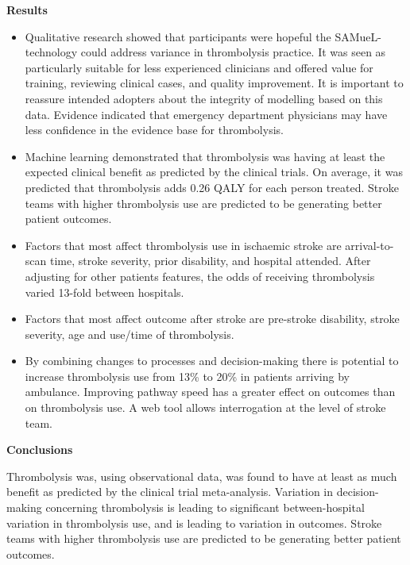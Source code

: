 \textbf{Results}

\begin{itemize}

    \item Qualitative research showed that participants were hopeful the SAMueL-technology could address variance in thrombolysis practice. It was seen as particularly suitable for less experienced clinicians and offered value for training, reviewing clinical cases, and quality improvement. It is important to reassure intended adopters about the integrity of modelling based on this data. Evidence indicated that emergency department physicians may have less confidence in the evidence base for thrombolysis.
    
    \item Machine learning demonstrated that thrombolysis was having at least the expected clinical benefit as predicted by the clinical trials. On average, it was predicted that thrombolysis adds 0.26 QALY for each person treated. Stroke teams with higher thrombolysis use are predicted to be generating better patient outcomes.
    
    \item Factors that most affect thrombolysis use in ischaemic stroke are arrival-to-scan time, stroke severity, prior disability, and hospital attended. After adjusting for other patients features, the odds of receiving thrombolysis varied 13-fold between hospitals.
    
    \item Factors  that most affect outcome after stroke are pre-stroke disability, stroke severity, age and use/time of thrombolysis.
    
    \item By combining changes to processes and decision-making there is potential to increase thrombolysis use from 13\% to 20\% in patients arriving by ambulance. Improving pathway speed has a greater effect on outcomes than on thrombolysis use. A web tool allows interrogation at the level of stroke team.
\end{itemize}


\textbf{Conclusions}

Thrombolysis was, using observational data, was found to have at least as much benefit as predicted by the clinical trial meta-analysis. Variation in decision-making concerning thrombolysis is leading to significant between-hospital variation in thrombolysis use, and is leading to variation in outcomes. Stroke teams with higher thrombolysis use are predicted to be generating better patient outcomes. 

